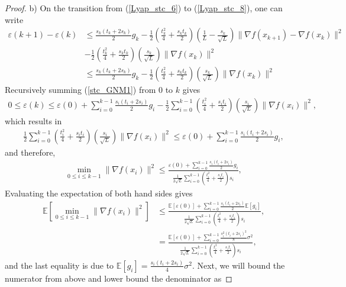 \documentclass{article}
\theoremstyle{plain}
\theoremstyle{definition}
\theoremstyle{remark}
\begin{document}
\begin{proof}
b) On the transition from (\ref{Lyap_stc_6}) to (\ref{Lyap_stc_8}), one can write
\begin{align}\label{stc_GNM1}
    \varepsilon(k+1)-\varepsilon(k)&\leq \frac{s_k(t_k+2s_k)}{2}g_k-\frac{1}{2}\left( \frac{t_k^2}{4}+\frac{s_kt_k}{2} \right)(\frac{1}{L}-\frac{s_k}{\sqrt{L}})\|\nabla f(x_{k+1})-\nabla f(x_k)\|^2\nonumber\\
    &-\frac{1}{2}\left(\frac{t_k^2}{4}+\frac{s_kt_k}{2}\right)(\frac{s_k}{\sqrt{L}})\|\nabla f(x_k)\|^2\nonumber\\
    &\leq \frac{s_k(t_k+2s_k)}{2}g_k-\frac{1}{2}\left(\frac{t_k^2}{4}+\frac{s_kt_k}{2}\right)(\frac{s_k}{\sqrt{L}})\|\nabla f(x_k)\|^2
\end{align}
Recursively summing (\ref{stc_GNM1}) from $0$ to $k$ gives
\begin{align}\label{stc_GNM2}
    0\leq\varepsilon(k)\leq \varepsilon(0)+ \sum_{i=0}^{k-1} \frac{s_i(t_i+2s_i)}{2}g_i -\frac{1}{2}\sum_{i=0}^{k-1}\left(\frac{t_i^2}{4}+\frac{s_it_i}{2}\right)(\frac{s_i}{\sqrt{L}})\|\nabla f(x_i)\|^2,
\end{align}
which results in
\begin{align}\label{stc_GNM3}
    \frac{1}{2}\sum_{i=0}^{k-1}\left(\frac{t_i^2}{4}+\frac{s_it_i}{2}\right)(\frac{s_i}{\sqrt{L}})\|\nabla f(x_i)\|^2\leq \varepsilon(0)+ \sum_{i=0}^{k-1} \frac{s_i(t_i+2s_i)}{2}g_i,
\end{align}
and therefore,
\begin{align}\label{stc_GNM4}
    \min_{0\leq i\leq k-1}\|\nabla f(x_i)\|^2 \leq \frac{\varepsilon(0)+ \sum_{i=0}^{k-1} \frac{s_i(t_i+2s_i)}{2}g_i}{\frac{1}{2\sqrt{L}}\sum_{i=0}^{k-1}\left(\frac{t_i^2}{4}+\frac{s_it_i}{2}\right)s_i},
\end{align}
Evaluating the expectation of both hand sides gives
\begin{align}\label{stc_GNM4}
    \mathbb E\left[\min_{0\leq i\leq k-1}\|\nabla f(x_i)\|^2 \right]&\leq \frac{\mathbb E\left[\varepsilon(0)\right]+ \sum_{i=0}^{k-1} \frac{s_i(t_i+2s_i)}{2}\mathbb E\left[g_i\right]}{\frac{1}{2\sqrt{L}}\sum_{i=0}^{k-1}\left(\frac{t_i^2}{4}+\frac{s_it_i}{2}\right)s_i},\nonumber\\
    &= \frac{\mathbb E\left[\varepsilon(0)\right]+ \sum_{i=0}^{k-1} \frac{s_i^2(t_i+2s_i)^2}{8}\sigma^2}{\frac{1}{2\sqrt{L}}\sum_{i=0}^{k-1}\left(\frac{t_i^2}{4}+\frac{s_it_i}{2}\right)s_i},
\end{align}
and the last equality is due to $\mathbb E[g_i]= \frac{s_i(t_i+2s_i)}{4}\sigma^2$. Next, we will bound the numerator from above and lower bound the denominator as 

\end{proof}
\end{document}
